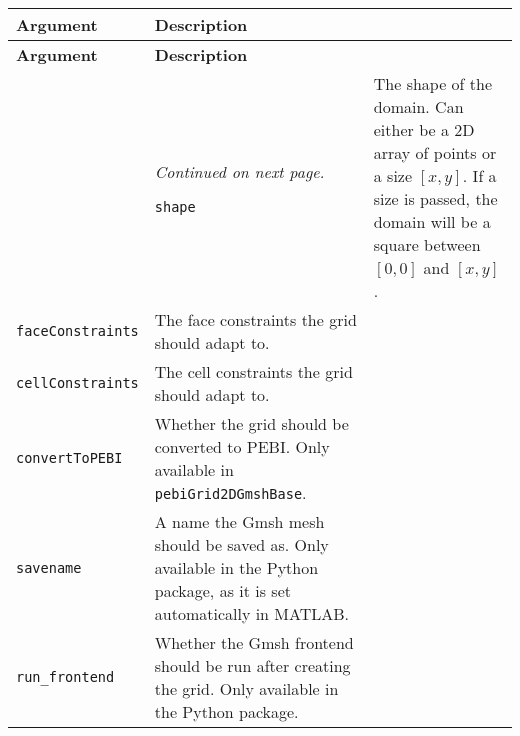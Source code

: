 \begin{tabularx}{\textwidth}{l X}
    \caption{Miscellaneous arguments in \texttt{gmsh4mrst}.}
    \label{tab:misc-arguments} \\
    \toprule \textbf{Argument} & \textbf{Description} \\\midrule \endfirsthead
    \textbf{Argument} & \textbf{Description} \\\midrule \endhead
    \bottomrule & \textit{Continued on next page.} \endfoot
    \bottomrule \endlastfoot
    
    \texttt{shape} & The shape of the domain. Can either be a 2D array of points or a size $[x, y]$. If a size is passed, the domain will be a square between $[0, 0]$ and $[x, y]$. \\
    \texttt{faceConstraints} & The face constraints the grid should adapt to. \\
    \texttt{cellConstraints} & The cell constraints the grid should adapt to. \\
    \texttt{convertToPEBI} & Whether the grid should be converted to PEBI. Only available in \texttt{pebiGrid2DGmshBase}. \\
    \texttt{savename} & A name the Gmsh mesh should be saved as. Only available in the Python package, as it is set automatically in MATLAB. \\
    \texttt{run\_frontend} & Whether the Gmsh frontend should be run after creating the grid. Only available in the Python package. \\
\end{tabularx}